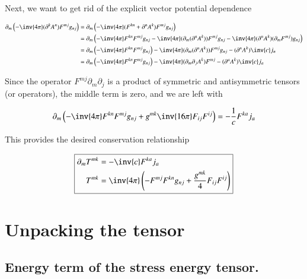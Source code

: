 Next, we want to get rid of the explicit vector potential dependence

\begin{align*}
\partial_m \left( -\inv{4 \pi } (\partial^k A^n )F^{m j} g_{n j} \right)
&=
\partial_m \left( -\inv{4 \pi } (F^{k n} + \partial^n A^k )F^{m j} g_{n j} \right) \\
&=
\partial_m \left( -\inv{4 \pi } F^{k n} F^{m j} g_{n j} 
- \inv{4 \pi} (\partial_m (\partial^n A^k )) F^{m j} g_{n j} 
- \inv{4 \pi} (\partial^n A^k ) (\partial_m F^{m j}) g_{n j} \right) \\
&=
\partial_m \left( -\inv{4 \pi } F^{k n} F^{m j} g_{n j} \right)
- \inv{4 \pi} (\partial_m (\partial^n A^k )) F^{m j} g_{n j} 
- (\partial^n A^k ) \inv{c} j_n \\
&=
\partial_m \left( -\inv{4 \pi } F^{k n} F^{m j} g_{n j} \right)
- \inv{4 \pi} (\partial_m \partial_j A^k ) F^{m j} 
- (\partial^a A^k ) \inv{c} j_a \\
\end{align*}

Since the operator $F^{m j} \partial_m \partial_j$ is a product of symmetric and antisymmetric tensors (or operators), the middle term is zero, and we are left with

\begin{equation}\label{eqn:relativisticElectrodynamicsL22:70}
\partial_m \left(
-\inv{4 \pi } F^{k n} F^{m j} g_{n j} 
+ g^{m k} \inv{16 \pi } F_{i j} F^{i j} 
\right)
= 
- \frac{1}{c} F^{k a} j_a
\end{equation}

This provides the desired conservation relationship

\begin{equation}\label{eqn:relativisticElectrodynamicsL22:90}
\boxed{
\begin{aligned}
\partial_m T^{m k} &= - \inv{c} F^{k a} j_a \\
T^{m k} &=
\inv{4 \pi } \left(
-
F^{m j} 
F^{k n} 
g_{n j} 
+ \frac{g^{m k}}{4} F_{i j} F^{i j} \right)
\end{aligned}
}
\end{equation}

\section{Unpacking the tensor}

\subsection{Energy term of the stress energy tensor.}

